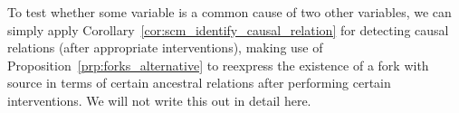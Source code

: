 
To test whether some variable is a common cause of two other variables, we can simply apply  
Corollary~\ref{cor:scm_identify_causal_relation} for detecting causal relations (after appropriate interventions), 
making use of Proposition~\ref{prp:forks_alternative} to reexpress the existence of a fork with source in terms of certain ancestral relations after performing certain interventions. We will not write this out in detail here.

